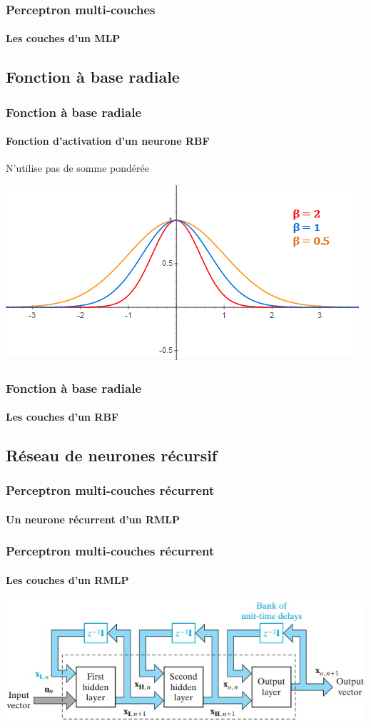 \begin{frame}
 \frametitle{Perceptron multi-couches}
 \framesubtitle{Les couches d'un MLP}
\end{frame}

\subsection{Fonction à base radiale}
\begin{frame}
 \frametitle{Fonction à base radiale}
 \framesubtitle{Fonction d'activation d'un neurone RBF}
 \alert{N'utilise pas de somme pondérée}
 \begin{center}
  \includegraphics[width=\textwidth]{../figures/RBFactivation.png}
 \end{center}
\end{frame}

\begin{frame}
 \frametitle{Fonction à base radiale}
 \framesubtitle{Les couches d'un RBF}
\end{frame}

\subsection{Réseau de neurones récursif}
\begin{frame}
 \frametitle{Perceptron multi-couches récurrent}
 \framesubtitle{Un neurone récurrent d'un RMLP}
\end{frame}

\begin{frame}
 \frametitle{Perceptron multi-couches récurrent}
 \framesubtitle{Les couches d'un RMLP}
 \begin{center}
  \includegraphics[width=\textwidth]{../figures/structurermlp.jpg}
 \end{center}
\end{frame}